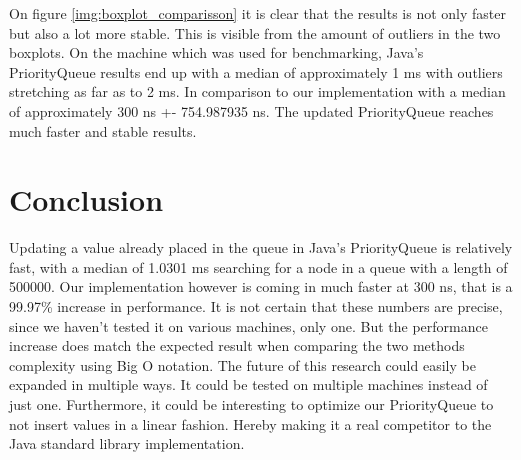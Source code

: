 \documentclass{article}
\begin{document}
On figure \ref{img:boxplot_comparisson} it is clear that the results is not only faster 
but also a lot more stable. This is visible from the amount of outliers in the two boxplots. 
On the machine which was used for benchmarking, Java's PriorityQueue results end up with a
median of approximately 1 ms with outliers stretching as far as to 2 ms. In comparison to 
our implementation with a median of approximately 300 ns +- 754.987935 ns. The updated 
PriorityQueue reaches much faster and stable results.  

\section{Conclusion} %
Updating a value already placed in the queue in Java's PriorityQueue is relatively
fast, with a median of 1.0301 ms searching for a node in a queue with a length of 
500000. Our implementation however is coming in much faster at 300 ns, that is a 99.97\% 
increase in performance. It is not certain that these numbers are precise, since we haven't 
tested it on various machines, only one. But the performance increase does match the expected result 
when comparing the two methods complexity using Big O notation. 
The future of this research could easily be expanded in multiple ways.
It could be tested on multiple machines instead of just one. Furthermore, it could be interesting
to optimize our PriorityQueue to not insert values in a linear fashion. Hereby making it a 
real competitor to the Java standard library implementation.




\end{document}
